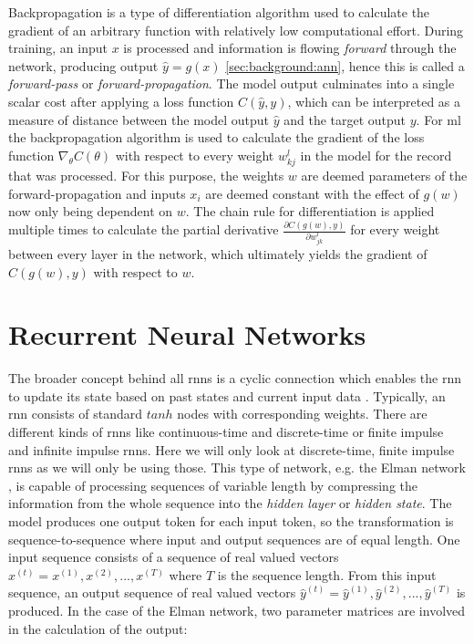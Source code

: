 Backpropagation is a type of differentiation algorithm used to calculate the gradient of an arbitrary function with relatively low computational effort. 
During training, an input $x$ is processed and information is flowing \textit{forward} through the network, producing output $\hat{y} = g(x)$ \ref{sec:background:ann}, hence this is called a \textit{forward-pass} or \textit{forward-propagation}. The model output culminates into a single scalar cost after applying a loss function $C(\hat{y}, y)$, which can be interpreted as a measure of distance between the model output $\hat{y}$ and the target output $y$. For \gls{ml} the backpropagation algorithm is used to calculate the gradient of the loss function $\nabla_\theta C(\theta)$ with respect to every weight $w^l_{kj}$ in the model for the record that was processed. For this purpose, the weights $w$ are deemed parameters of the forward-propagation and inputs $x_i$ are deemed constant with the effect of $g(w)$ now only being dependent on $w$. The chain rule for differentiation is applied multiple times to calculate the partial derivative $\frac{\partial C(g(w),y)}{\partial w^l_{jk}}$ for every weight between every layer in the network, which ultimately yields the gradient of $C(g(w),y)$ with respect to $w$.

\section{Recurrent Neural Networks} \label{sec:background:rnn}

The broader concept behind all \glspl{rnn} is a cyclic connection which enables the \gls{rnn} to update its state based on past states and current input data \cite{rnn_review}. Typically, an \gls{rnn} consists of standard $tanh$ nodes with corresponding weights. There are different kinds of \glspl{rnn} like continuous-time and discrete-time or finite impulse and infinite impulse \glspl{rnn}. Here we will only look at discrete-time, finite impulse \glspl{rnn} as we will only be using those. This type of network, e.g. the Elman network \cite{rnn_elman}, is capable of processing sequences of variable length by compressing the information from the whole sequence into the \textit{hidden layer} or \textit{hidden state}. The model produces one output token for each input token, so the transformation is sequence-to-sequence where input and output sequences are of equal length. One input sequence consists of a sequence of real valued vectors $x^{(t)} = x^{(1)}, x^{(2)}, ... , x^{(T)}$ where $T$ is the sequence length. From this input sequence, an output sequence of real valued vectors $\hat{y}^{(t)} = \hat{y}^{(1)}, \hat{y}^{(2)}, ... , \hat{y}^{(T)}$ is produced. In the case of the Elman network, two parameter matrices are involved in the calculation of the output:

